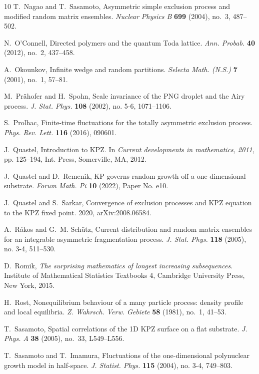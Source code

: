 \documentclass[10pt]{article}
\theoremstyle{plain}
\theoremstyle{definition}
\numberwithin{equation}{section}
\begin{document}
\begin{thebibliography}{10}
T.~Nagao and T.~Sasamoto, Asymmetric simple exclusion process and modified random matrix ensembles. \emph{Nuclear Physics B}
  \textbf{699} (2004), no.~3, 487--502.
  
  
N.~O'Connell, Directed polymers and the quantum {T}oda lattice. \emph{Ann.
  Probab.} \textbf{40} (2012), no.~2, 437--458.

A.~Okounkov, Infinite wedge and random partitions. \emph{Selecta Math. (N.S.)}
  \textbf{7} (2001), no.~1, 57--81.

M.~Pr{\"a}hofer and H.~Spohn, Scale invariance of the {PNG} droplet and the
  {A}iry process. \emph{J. Stat. Phys.} \textbf{108} (2002), no. 5-6,
  1071--1106.

S.~Prolhac, Finite-time fluctuations for the totally asymmetric exclusion
  process. \emph{Phys. Rev. Lett.} \textbf{116} (2016), 090601.

J.~Quastel, Introduction to {KPZ}. In \emph{Current developments in
  mathematics, 2011}, pp. 125--194, Int. Press, Somerville, MA, 2012.

J.~Quastel and D.~Remenik, {KP} governs random growth off a one dimensional
  substrate.  \emph{Forum Math. Pi} \textbf{10} (2022), Paper No. e10.
  

J.~Quastel and S.~Sarkar, Convergence of exclusion processes and {KPZ} equation
  to the {KPZ} fixed point. 2020, arXiv:2008.06584.

A.~R{\'a}kos and G.~M. Sch{\"u}tz, Current distribution and random matrix
  ensembles for an integrable asymmetric fragmentation process. \emph{J. Stat.
  Phys.} \textbf{118} (2005), no. 3-4, 511--530.

D.~Romik, \emph{The surprising mathematics of longest increasing subsequences}.
  Institute of Mathematical Statistics Textbooks 4, Cambridge University Press,
  New York, 2015.

H.~Rost, Nonequilibrium behaviour of a many particle process: density profile
  and local equilibria. \emph{Z. Wahrsch. Verw. Gebiete} \textbf{58} (1981),
  no.~1, 41--53.

T.~Sasamoto, Spatial correlations of the 1{D} {KPZ} surface on a flat
  substrate. \emph{J. Phys. A} \textbf{38} (2005), no.~33, L549--L556.

T.~Sasamoto and T.~Imamura, Fluctuations of the one-dimensional polynuclear
  growth model in half-space. \emph{J. Statist. Phys.} \textbf{115} (2004), no.
  3-4, 749--803.


\end{thebibliography}
\end{document}
